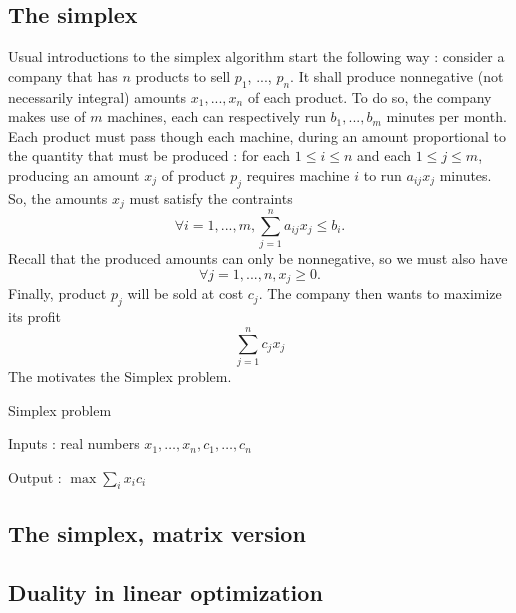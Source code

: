 \subsection{The simplex}
Usual introductions to the simplex algorithm start the following way : consider a company that has $n$ products to sell $p_1$, ..., $p_n$. It shall produce nonnegative (not necessarily integral) amounts $x_1,...,x_n$ of each product. To do so, the company makes use of $m$ machines, each can respectively run $b_1, ..., b_m$ minutes per month. Each product must pass though each machine, during an amount proportional to the quantity that must be produced : for each $1\le i\le n$ and each $1\le j\le m$, producing an amount $x_j$ of product $p_j$ requires machine $i$ to run $a_{ij}x_j$ minutes. So, the amounts $x_j$ must satisfy the contraints
\[
    \forall i=1,...,m, \sum_{j=1}^n a_{ij} x_j \leqslant b_i.
\]
Recall that the produced amounts can only be nonnegative, so we must also have
\[
    \forall j=1,...,n, x_j \geqslant 0.
\]
Finally, product $p_j$ will be sold at cost $c_j$. The company then wants to maximize its profit
\[
    \sum_{j=1}^n c_j x_j
\]
The motivates the Simplex problem.

\begin{problem}
Simplex problem

Inputs : real numbers $x_1,\ldots,x_n, c_1,\ldots,c_n$

Output : $ \displaystyle \max \sum_i x_i c_i$
\end{problem}

\subsection{The simplex, matrix version}
\subsection{Duality in linear optimization}